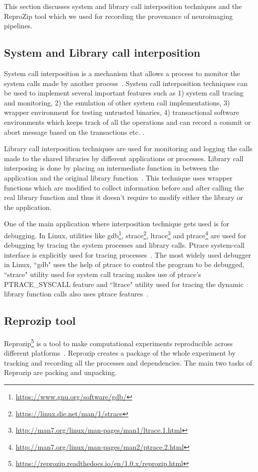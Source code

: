 This section discusses system and library call interposition techniques and the ReproZip tool which we used for recording the provenance of neuroimaging pipelines.
\subsection{System and Library call interposition}
System call interposition is a mechanism that allows a process to monitor the system calls made by another process~\cite{Jain00user-levelinfrastructure}. System call interposition techniques can be used to implement several important features such as 1) system call tracing and monitoring, 2) the emulation of other system call implementations, 3) wrapper environment for testing untrusted binaries, 4) transactional software environments which keeps track of all the operations and can record a commit or abort message based on the transactions etc. \cite{Jones93}.

Library call interposition techniques are used for monitoring and logging the calls made to the shared libraries by different applications or processes. Library call interposing is done by placing an intermediate function in between the application and the original library function~\cite{Curry:1994:PTD:1267257.1267275}. This technique uses wrapper functions which are modified to collect information before and after calling the real library function and thus it doesn't require to modify either the library or the application.

One of the main application where interposition technique gets used is for debugging. In Linux, utilities like gdb\footnote{\url{https://www.gnu.org/software/gdb/}}, strace\footnote{\url{https://linux.die.net/man/1/strace}}, ltrace\footnote{\url{http://man7.org/linux/man-pages/man1/ltrace.1.html}} and ptrace\footnote{\url{http://man7.org/linux/man-pages/man2/ptrace.2.html}} are used for debugging by tracing the system processes and library calls. Ptrace system-call interface is explicitly used for tracing processes~\cite{Keniston_ptrace}. The most widely used debugger in Linux, ``gdb" uses the help of ptrace to control the program to be debugged, ``strace" utility used for system call tracing makes use of ptrace's PTRACE\_SYSCALL feature and ``ltrace" utility used for tracing the dynamic library function calls also uses ptrace features~\cite{Keniston_ptrace}.

\subsection{Reprozip tool}
Reprozip\footnote{\url{https://reprozip.readthedocs.io/en/1.0.x/reprozip.html}} is a tool to make computational experiments reproducible across different platforms~\cite{Chirigati:2013:RUP:2482613.2482614}. Reprozip creates a package of the whole experiment by tracking and recording all the processes and dependencies. The main two tasks of Reprozip are packing and unpacking.

